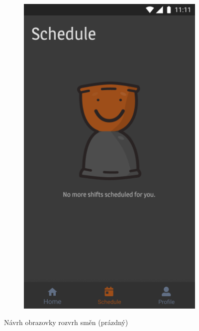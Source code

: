 \documentclass[twoside]{ctuthesis}
\begin{document}
\begin{figure}[h]
\begin{subfigure}[h!]{.5\textwidth}
		\includegraphics[width=.9\linewidth]{img/v1-main-home-schedule-empty-night.png}
		\label{fig:main-schedule-dark-empty}
	\end{subfigure}
	\caption{Návrh obrazovky rozvrh směn (prázdný)}
\end{figure}
\end{document}
